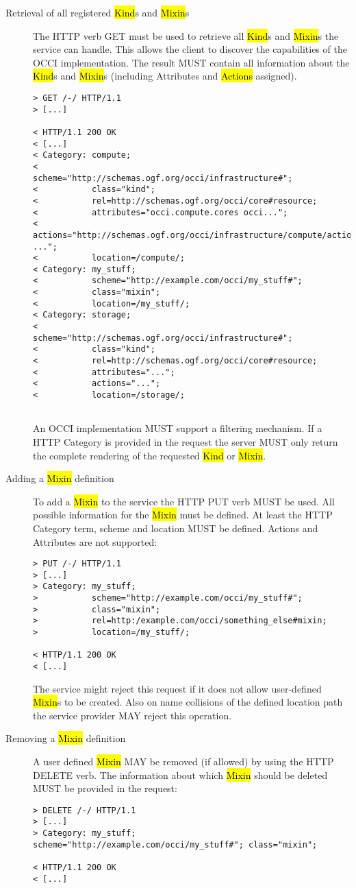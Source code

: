 \documentclass[10pt,a4paper]{article}
\begin{document}
\begin{description}
\item[Retrieval of all registered \hl{Kind}s and \hl{Mixin}s] The HTTP
  verb GET must be used to retrieve all \hl{Kind}s and \hl{Mixin}s
  the service can handle. This allows the client to discover the
  capabilities of the OCCI implementation. The result MUST contain all
  information about the \hl{Kind}s and \hl{Mixin}s (including
  Attributes and \hl{Actions} assigned).
\begin{verbatim}
> GET /-/ HTTP/1.1
> [...]
 
< HTTP/1.1 200 OK
< [...]
< Category: compute;
<           scheme="http://schemas.ogf.org/occi/infrastructure#";
<           class="kind";
<           rel=http://schemas.ogf.org/occi/core#resource;
<           attributes="occi.compute.cores occi...";
<           actions="http://schemas.ogf.org/occi/infrastructure/compute/action#stop ...";
<           location=/compute/;
< Category: my_stuff;
<           scheme="http://example.com/occi/my_stuff#";
<           class="mixin";
<           location=/my_stuff/;
< Category: storage; 
<           scheme="http://schemas.ogf.org/occi/infrastructure#";
<           class="kind";
<           rel=http://schemas.ogf.org/occi/core#resource;
<           attributes="...";
<           actions="...";
<           location=/storage/;
 
\end{verbatim}
An OCCI implementation MUST support a filtering mechanism. If a HTTP
Category is provided in the request the server MUST only return the
complete rendering of the requested \hl{Kind} or \hl{Mixin}.

\item[Adding a \hl{Mixin} definition] To add a \hl{Mixin} to the
  service the HTTP PUT verb MUST be used. All possible information for
  the \hl{Mixin} must be defined. At least the HTTP Category term,
  scheme and location MUST be defined. Actions and Attributes are not
  supported:
\begin{verbatim}
> PUT /-/ HTTP/1.1
> [...]
> Category: my_stuff;
>           scheme="http://example.com/occi/my_stuff#";
>           class="mixin";
>           rel=http:/example.com/occi/something_else#mixin;
>           location=/my_stuff/;

< HTTP/1.1 200 OK
< [...]
\end{verbatim}
The service might reject this request if it does not allow
user-defined \hl{Mixin}s to be created. Also on name collisions of the
defined location path the service provider MAY reject this
operation.

\item[Removing a \hl{Mixin} definition] A user defined \hl{Mixin} MAY
  be removed (if allowed) by using the HTTP DELETE verb. The
  information about which \hl{Mixin} should be deleted MUST be
  provided in the request:
\begin{verbatim}
> DELETE /-/ HTTP/1.1
> [...]
> Category: my_stuff; scheme="http://example.com/occi/my_stuff#"; class="mixin";

< HTTP/1.1 200 OK
< [...]
\end{verbatim}
\end{description}
\end{document}
